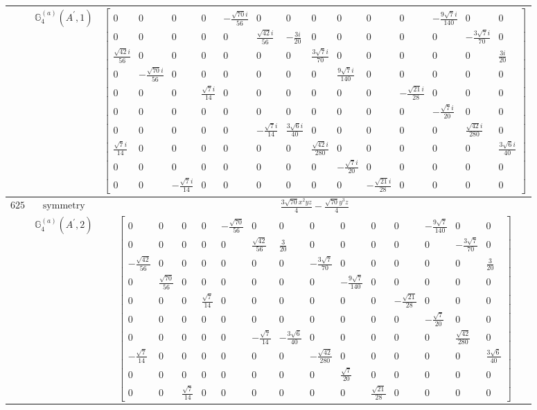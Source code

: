 \documentclass[fleqn,8pt,landscape]{jsarticle}
\begin{document}
\begin{longtable}{ccc}
$  $ & $ \mathbb{G}_{4}^{(a)}(A^{\prime},1) $ & $ \begin{bmatrix} 0 & 0 & 0 & 0 & - \frac{\sqrt{70} i}{56} & 0 & 0 & 0 & 0 & 0 & 0 & - \frac{9 \sqrt{7} i}{140} & 0 & 0 \\ 0 & 0 & 0 & 0 & 0 & \frac{\sqrt{42} i}{56} & - \frac{3 i}{20} & 0 & 0 & 0 & 0 & 0 & - \frac{3 \sqrt{7} i}{70} & 0 \\ \frac{\sqrt{42} i}{56} & 0 & 0 & 0 & 0 & 0 & 0 & \frac{3 \sqrt{7} i}{70} & 0 & 0 & 0 & 0 & 0 & \frac{3 i}{20} \\ 0 & - \frac{\sqrt{70} i}{56} & 0 & 0 & 0 & 0 & 0 & 0 & \frac{9 \sqrt{7} i}{140} & 0 & 0 & 0 & 0 & 0 \\ 0 & 0 & 0 & \frac{\sqrt{7} i}{14} & 0 & 0 & 0 & 0 & 0 & 0 & - \frac{\sqrt{21} i}{28} & 0 & 0 & 0 \\ 0 & 0 & 0 & 0 & 0 & 0 & 0 & 0 & 0 & 0 & 0 & - \frac{\sqrt{7} i}{20} & 0 & 0 \\ 0 & 0 & 0 & 0 & 0 & - \frac{\sqrt{7} i}{14} & \frac{3 \sqrt{6} i}{40} & 0 & 0 & 0 & 0 & 0 & \frac{\sqrt{42} i}{280} & 0 \\ \frac{\sqrt{7} i}{14} & 0 & 0 & 0 & 0 & 0 & 0 & \frac{\sqrt{42} i}{280} & 0 & 0 & 0 & 0 & 0 & \frac{3 \sqrt{6} i}{40} \\ 0 & 0 & 0 & 0 & 0 & 0 & 0 & 0 & - \frac{\sqrt{7} i}{20} & 0 & 0 & 0 & 0 & 0 \\ 0 & 0 & - \frac{\sqrt{7} i}{14} & 0 & 0 & 0 & 0 & 0 & 0 & - \frac{\sqrt{21} i}{28} & 0 & 0 & 0 & 0 \end{bmatrix} $ \\ \hline
$ 625 $ & $ \text{symmetry} $ & $ \frac{3 \sqrt{70} x^{2} y z}{4} - \frac{\sqrt{70} y^{3} z}{4} $ \\
$  $ & $ \mathbb{G}_{4}^{(a)}(A^{\prime},2) $ & $ \begin{bmatrix} 0 & 0 & 0 & 0 & - \frac{\sqrt{70}}{56} & 0 & 0 & 0 & 0 & 0 & 0 & - \frac{9 \sqrt{7}}{140} & 0 & 0 \\ 0 & 0 & 0 & 0 & 0 & \frac{\sqrt{42}}{56} & \frac{3}{20} & 0 & 0 & 0 & 0 & 0 & - \frac{3 \sqrt{7}}{70} & 0 \\ - \frac{\sqrt{42}}{56} & 0 & 0 & 0 & 0 & 0 & 0 & - \frac{3 \sqrt{7}}{70} & 0 & 0 & 0 & 0 & 0 & \frac{3}{20} \\ 0 & \frac{\sqrt{70}}{56} & 0 & 0 & 0 & 0 & 0 & 0 & - \frac{9 \sqrt{7}}{140} & 0 & 0 & 0 & 0 & 0 \\ 0 & 0 & 0 & \frac{\sqrt{7}}{14} & 0 & 0 & 0 & 0 & 0 & 0 & - \frac{\sqrt{21}}{28} & 0 & 0 & 0 \\ 0 & 0 & 0 & 0 & 0 & 0 & 0 & 0 & 0 & 0 & 0 & - \frac{\sqrt{7}}{20} & 0 & 0 \\ 0 & 0 & 0 & 0 & 0 & - \frac{\sqrt{7}}{14} & - \frac{3 \sqrt{6}}{40} & 0 & 0 & 0 & 0 & 0 & \frac{\sqrt{42}}{280} & 0 \\ - \frac{\sqrt{7}}{14} & 0 & 0 & 0 & 0 & 0 & 0 & - \frac{\sqrt{42}}{280} & 0 & 0 & 0 & 0 & 0 & \frac{3 \sqrt{6}}{40} \\ 0 & 0 & 0 & 0 & 0 & 0 & 0 & 0 & \frac{\sqrt{7}}{20} & 0 & 0 & 0 & 0 & 0 \\ 0 & 0 & \frac{\sqrt{7}}{14} & 0 & 0 & 0 & 0 & 0 & 0 & \frac{\sqrt{21}}{28} & 0 & 0 & 0 & 0 \end{bmatrix} $ \\ \hline

\end{longtable}
\end{document}
